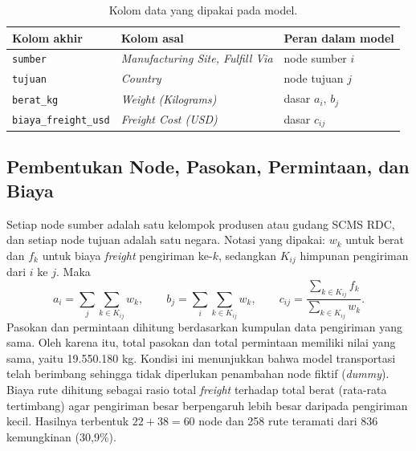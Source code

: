 \documentclass[a4paper,11pt]{article}
\begin{document}
\begin{table}[htbp]
\centering
\caption{Kolom data yang dipakai pada model.}\label{tab:kolom}
\small
\begin{tabular}{@{}lll@{}}
\toprule
Kolom akhir & Kolom asal & Peran dalam model \\
\midrule
\texttt{sumber} & \textit{Manufacturing Site, Fulfill Via} & node sumber $i$ \\
\texttt{tujuan} & \textit{Country} & node tujuan $j$ \\
\texttt{berat\_kg} & \textit{Weight (Kilograms)} & dasar $a_i$, $b_j$ \\
\texttt{biaya\_freight\_usd} & \textit{Freight Cost (USD)} & dasar $c_{ij}$ \\
\bottomrule
\end{tabular}
\end{table}

\subsection{Pembentukan Node, Pasokan, Permintaan, dan Biaya}
Setiap node sumber adalah satu kelompok produsen atau gudang SCMS RDC, dan setiap node tujuan adalah satu negara. Notasi yang dipakai: $w_k$ untuk berat dan $f_k$ untuk biaya \textit{freight} pengiriman ke-$k$, sedangkan $K_{ij}$ himpunan pengiriman dari $i$ ke $j$. Maka
\begin{equation}
a_i = \sum_j \sum_{k\in K_{ij}} w_k, \qquad b_j = \sum_i \sum_{k\in K_{ij}} w_k, \qquad c_{ij} = \frac{\sum_{k\in K_{ij}} f_k}{\sum_{k\in K_{ij}} w_k}. \label{eq:agg}
\end{equation}
Pasokan dan permintaan dihitung berdasarkan kumpulan data pengiriman yang sama. Oleh karena itu, total pasokan dan total permintaan memiliki nilai yang sama, yaitu 19.550.180 kg. Kondisi ini menunjukkan bahwa model transportasi telah berimbang sehingga tidak diperlukan penambahan node fiktif (\textit{dummy}). Biaya rute dihitung sebagai rasio total \textit{freight} terhadap total berat (rata-rata tertimbang) agar pengiriman besar berpengaruh lebih besar daripada pengiriman kecil. Hasilnya terbentuk $22+38=60$ node dan 258 rute teramati dari 836 kemungkinan (30,9\%).
\end{document}
